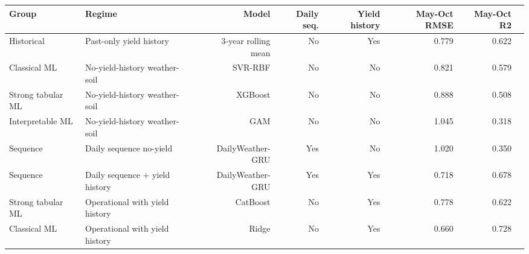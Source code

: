 \begin{tabular}{llrrrrrr}
\toprule
Group & Regime & Model & Daily seq. & Yield history & May-Oct RMSE & May-Oct R2 \\
\midrule
Historical & Past-only yield history & 3-year rolling mean & No & Yes & 0.779 & 0.622 \\
Classical ML & No-yield-history weather-soil & SVR-RBF & No & No & 0.821 & 0.579 \\
Strong tabular ML & No-yield-history weather-soil & XGBoost & No & No & 0.888 & 0.508 \\
Interpretable ML & No-yield-history weather-soil & GAM & No & No & 1.045 & 0.318 \\
Sequence & Daily sequence no-yield & DailyWeather-GRU & Yes & No & 1.020 & 0.350 \\
Sequence & Daily sequence + yield history & DailyWeather-GRU & Yes & Yes & 0.718 & 0.678 \\
Strong tabular ML & Operational with yield history & CatBoost & No & Yes & 0.778 & 0.622 \\
Classical ML & Operational with yield history & Ridge & No & Yes & 0.660 & 0.728 \\
\bottomrule
\end{tabular}
